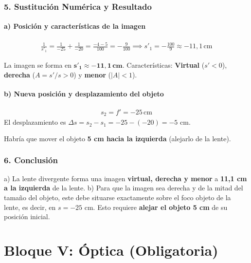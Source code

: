\subsubsection*{5. Sustitución Numérica y Resultado}
\paragraph*{a) Posición y características de la imagen}
\begin{gather}
    \frac{1}{s'_1} = \frac{1}{-25} + \frac{1}{-20} = \frac{-4-5}{100} = -\frac{9}{100} \implies s'_1 = -\frac{100}{9} \approx -11,1 \, \text{cm}
\end{gather}
\begin{cajaresultado}
    La imagen se forma en $\boldsymbol{s'_1 \approx -11,1 \, cm}$.
    Características: \textbf{Virtual} ($s'<0$), \textbf{derecha} ($A = s'/s > 0$) y \textbf{menor} ($|A| < 1$).
\end{cajaresultado}

\paragraph*{b) Nueva posición y desplazamiento del objeto}
\begin{gather}
    s_2 = f' = -25 \, \text{cm}
\end{gather}
El desplazamiento es $\Delta s = s_2 - s_1 = -25 - (-20) = -5$ cm.
\begin{cajaresultado}
    Habría que mover el objeto \textbf{5 cm hacia la izquierda} (alejarlo de la lente).
\end{cajaresultado}

\subsubsection*{6. Conclusión}
\begin{cajaconclusion}
    a) La lente divergente forma una imagen \textbf{virtual, derecha y menor} a \textbf{11,1 cm a la izquierda} de la lente.
    b) Para que la imagen sea derecha y de la mitad del tamaño del objeto, este debe situarse exactamente sobre el foco objeto de la lente, es decir, en $s=-25$ cm. Esto requiere \textbf{alejar el objeto 5 cm} de su posición inicial.
\end{cajaconclusion}

\newpage

\section{Bloque V: Óptica (Obligatoria)}
\label{sec:optica_2025_jun_res}
